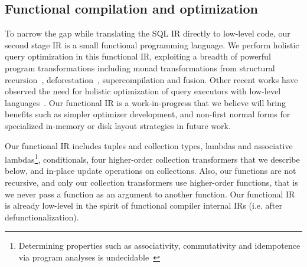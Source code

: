 \subsection{Functional compilation and optimization}
\label{sec:kthree}



\def\map{\mbox{\texttt{map}}}
\def\flatten{\mbox{\texttt{flatten}}}
\def\agg{\mbox{\texttt{agg}}}
\def\groupagg{\mbox{\texttt{groupagg}}}
\def\apply{\mbox{\texttt{apply}}}


To narrow the gap while translating the SQL IR directly to low-level code, our
second stage IR is a small functional programming language.
We perform holistic query optimization in this functional IR, exploiting a
breadth of powerful program transformations including monad transformations from
structural recursion~\cite{buneman-kleisli:95},
deforestation~\cite{marlow-fp:92}, supercompilation and fusion.
Other recent works have observed the need for holistic optimization of query
executors with low-level languages~\cite{krikellas-icde:10,neumann-pvldb:11}.
Our functional IR is a work-in-progress that we believe will bring benefits such
as simpler optimizer development, and non-first normal forms for specialized
in-memory or disk layout strategies in future work.


Our functional IR includes tuples and collection types, lambdas and associative
lambdas\footnote{Determining properties such as associativity, commutativity and
idempotence via program analyses is undecidable~\cite{buneman-kleisli:95}},
conditionals, four higher-order collection transformers that we describe below,
and in-place update operations on collections.
Also, our functions are not recursive, and only our collection transformers use
higher-order functions, that is we never pass a function as an argument to
another function. Our functional IR is already low-level in the spirit of
functional compiler internal IRs (i.e. after defunctionalization).



